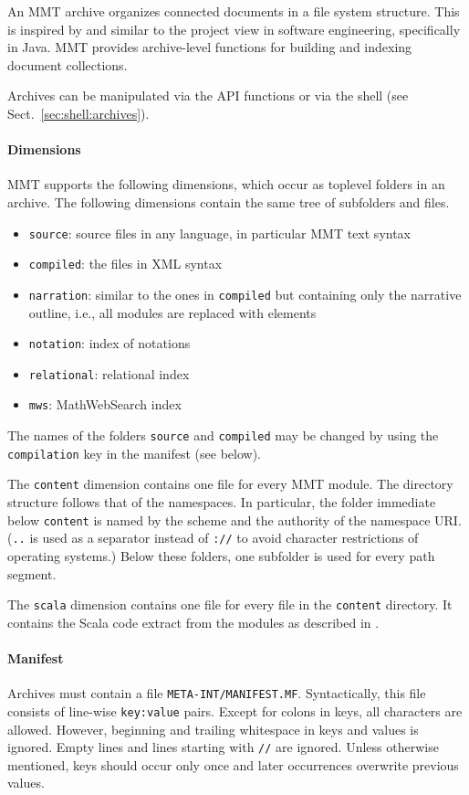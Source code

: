 An MMT archive \cite{HIJKR:dimensions:11} organizes connected documents in a file system structure. This is inspired by and similar to the project view in software engineering, specifically in Java. MMT provides archive-level functions for building and indexing document collections.

Archives can be manipulated via the API functions or via the shell (see Sect.~\ref{sec:shell:archives}).

\paragraph{Dimensions}
MMT supports the following dimensions, which occur as toplevel folders in an archive.
The following dimensions contain the same tree of subfolders and files.
\begin{itemize}
 \item \texttt{source}: source files in any language, in particular MMT text syntax
 \item \texttt{compiled}: the files in \mmt XML syntax
 \item \texttt{narration}: similar to the ones in \texttt{compiled} but containing only the narrative outline, i.e., all {\mmt} modules are replaced with  elements
 \item \texttt{notation}: index of notations
 \item \texttt{relational}: relational index
 \item \texttt{mws}: MathWebSearch \cite{mathwebsearch} index
\end{itemize}
The names of the folders \texttt{source} and \texttt{compiled} may be changed by using the \texttt{compilation} key in the manifest (see below).

The \texttt{content} dimension contains one file for every MMT module. The directory structure follows that of the {\mmt} namespaces. In particular, the folder immediate below \texttt{content} is named by the scheme and the authority of the namespace URI. (\texttt{..} is used as a separator instead of \texttt{://} to avoid character restrictions of operating systems.) Below these folders, one subfolder is used for every path segment.

The \texttt{scala} dimension contains one file for every file in the \texttt{content} directory.
It contains the Scala code extract from the \mmt modules as described in \cite{KMR:uom:13}.

\paragraph{Manifest}
Archives must contain a file \texttt{META-INT/MANIFEST.MF}. Syntactically, this file consists of line-wise \texttt{key:value} pairs. Except for colons in keys, all characters are allowed. However, beginning and trailing whitespace in keys and values is ignored. Empty lines and lines starting with \texttt{//} are ignored.
Unless otherwise mentioned, keys should occur only once and later occurrences overwrite previous values.

